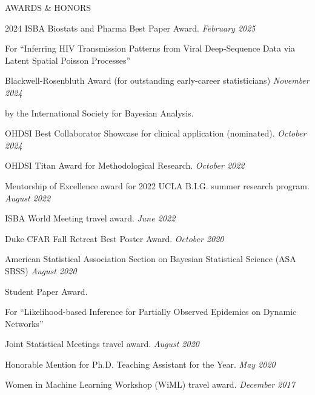 \documentclass{resume} %
\newcommand{\thisYear}[1]{
	#1
}
\begin{document}

%


\begin{rSection}{AWARDS \& HONORS}

2024 ISBA Biostats and Pharma Best Paper Award. \hfill {\em February 2025}

\vspace{-0.1in}
{\footnotesize For ``Inferring HIV Transmission Patterns from Viral Deep-Sequence Data via Latent Spatial Poisson Processes''}


Blackwell-Rosenbluth Award (for outstanding early-career statisticians) \hfill {\em November 2024}

\vspace{-0.1in}

\thisYear{
by the International Society for Bayesian Analysis. 
}

	
OHDSI Best Collaborator Showcase for clinical application (nominated).
\hfill {\em October 2024}

OHDSI Titan Award for Methodological Research. 
\hfill {\em October 2022}

Mentorship of Excellence award for 2022 UCLA B.I.G. summer research program. \hfill {\em August 2022}

ISBA World Meeting travel award.
\hfill {\em June 2022}

Duke CFAR Fall Retreat Best Poster Award. 
\hfill {\em October 2020}

American Statistical Association Section on Bayesian Statistical Science (ASA SBSS)
\hfill {\em August 2020}

\vspace{-0.1in}
Student Paper Award. 

\vspace{-0.1in}
{\footnotesize For ``Likelihood-based Inference for Partially Observed Epidemics on Dynamic Networks''}

Joint Statistical Meetings travel award. \hfill {\em August 2020}

Honorable Mention for Ph.D. Teaching Assistant for the Year. 
\hfill {\em May 2020}

Women in Machine Learning Workshop (WiML) travel award. \hfill {\em December 2017}

\end{rSection}
\end{document}

